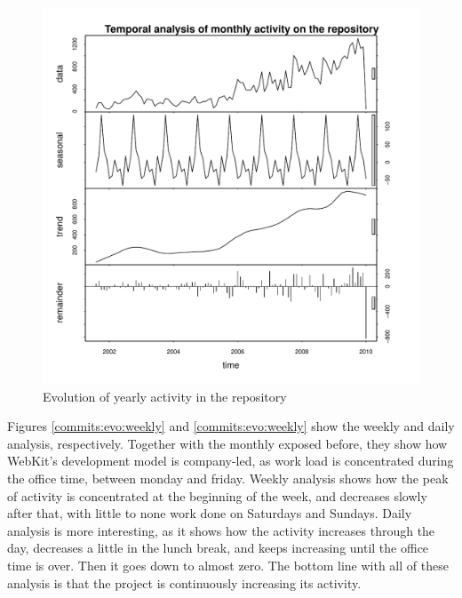 \begin{figure}[!hptb]
\includegraphics[width=400pt]{images/commitsByMonth.pdf}
\caption{Evolution of yearly activity in the repository}
\label{commits:evo:monthly}
\end{figure}

Figures \ref{commits:evo:weekly} and \ref{commits:evo:weekly} show the weekly and daily analysis, respectively. Together with the monthly exposed before, they show how WebKit's development model is company-led, as work load is concentrated during the office time, between monday and friday. 
Weekly analysis shows how the peak of activity is concentrated at the beginning of the week, and decreases slowly after that, with little to none work done on Saturdays and Sundays.  
Daily analysis is more interesting, as it shows how the activity increases through the day, decreases a little in the lunch break, and keeps increasing until the office time is over. Then it goes down to almost zero.
The bottom line with all of these analysis is that the project is continuously increasing its activity. 

